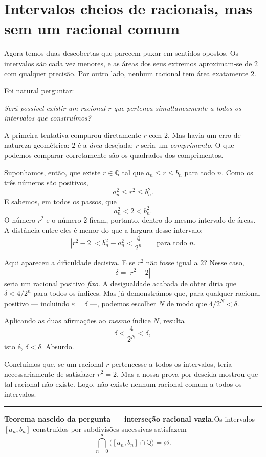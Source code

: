 \documentclass[11pt,a4paper]{article}
\newcommand{\Q}{\mathbb{Q}}
\newcommand{\questao}[1]{\par\medskip\noindent\textit{#1}\par\smallskip}
\newcommand{\assentado}[2]{%
\par\medskip\noindent\begingroup\color{azul}\rule{\linewidth}{0.45pt}\par\smallskip
\noindent\textbf{#1.}\enspace #2\par\endgroup\medskip}
\begin{document}
\section{Intervalos cheios de racionais, mas sem um racional comum}

Agora temos duas descobertas que parecem puxar em sentidos opostos. Os intervalos são cada vez menores, e as áreas dos seus extremos aproximam-se de $2$ com qualquer precisão. Por outro lado, nenhum racional tem área exatamente $2$.

Foi natural perguntar:

\questao{Será possível existir um racional $r$ que pertença simultaneamente a todos os intervalos que construímos?}

A primeira tentativa comparou diretamente $r$ com $2$. Mas havia um erro de natureza geométrica: $2$ é a \emph{área} desejada; $r$ seria um \emph{comprimento}. O que podemos comparar corretamente são os quadrados dos comprimentos.

Suponhamos, então, que existe $r\in\Q$ tal que $a_n\le r\le b_n$ para todo $n$. Como os três números são positivos,
\[
a_n^2\le r^2\le b_n^2.
\]
E sabemos, em todos os passos, que
\[
a_n^2<2<b_n^2.
\]
O número $r^2$ e o número $2$ ficam, portanto, dentro do mesmo intervalo de áreas. A distância entre eles é menor do que a largura desse intervalo:
\[
\boxed{|r^2-2|<b_n^2-a_n^2<\frac4{2^n}}
\qquad\text{para todo }n.
\]

Aqui apareceu a dificuldade decisiva. E se $r^2$ não fosse igual a $2$? Nesse caso,
\[
\delta=|r^2-2|
\]
seria um racional positivo \emph{fixo}. A desigualdade acabada de obter diria que $\delta<4/2^n$ para todos os índices. Mas já demonstrámos que, para qualquer racional positivo --- incluindo $\varepsilon=\delta$ ---, podemos escolher $N$ de modo que $4/2^N<\delta$.

Aplicando as duas afirmações ao \emph{mesmo} índice $N$, resulta
\[
\delta<\frac4{2^N}<\delta,
\]
isto é, $\delta<\delta$. Absurdo.

Concluímos que, se um racional $r$ pertencesse a todos os intervalos, teria necessariamente de satisfazer $r^2=2$. Mas a nossa prova por descida mostrou que tal racional não existe. Logo, não existe nenhum racional comum a todos os intervalos.

\assentado{Teorema nascido da pergunta --- interseção racional vazia}{Os intervalos $[a_n,b_n]$ construídos por subdivisões sucessivas satisfazem
\[
\bigcap_{n=0}^{\infty}\bigl([a_n,b_n]\cap\Q\bigr)=\varnothing.
\]}
\end{document}
